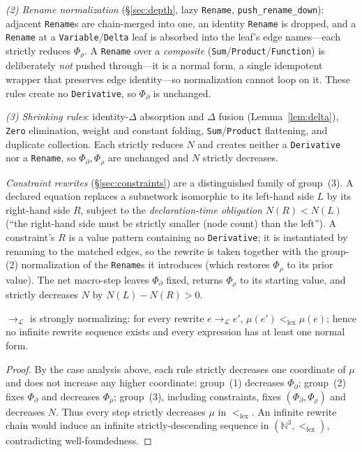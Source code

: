 \documentclass[sigplan,10pt,review]{acmart}
\begin{document}
\emph{(2) Rename normalization} (\S\ref{sec:depth}, lazy
\texttt{Rename}, \texttt{push\_rename\_down}): adjacent
\texttt{Rename}s are chain-merged into one, an identity \texttt{Rename}
is dropped, and a \texttt{Rename} at a \texttt{Variable}/\texttt{Delta}
leaf is absorbed into the leaf's edge names---each strictly reduces
$\Phi_\rho$. A \texttt{Rename} over a \emph{composite}
(\texttt{Sum}/\texttt{Product}/\texttt{Function}) is deliberately
\emph{not} pushed through---it is a normal form, a single idempotent
wrapper that preserves edge identity---so normalization cannot loop on
it. These rules create no \texttt{Derivative}, so $\Phi_\partial$ is
unchanged.

\emph{(3) Shrinking rules}: identity-$\Delta$ absorption and $\Delta$
fusion (Lemma~\ref{lem:delta}), \texttt{Zero} elimination, weight and
constant folding, \texttt{Sum}/\texttt{Product} flattening, and
duplicate collection. Each strictly reduces $N$ and creates neither a
\texttt{Derivative} nor a \texttt{Rename}, so $\Phi_\partial,\Phi_\rho$
are unchanged and $N$ strictly decreases.

\emph{Constraint rewrites} (\S\ref{sec:constraints}) are a distinguished
family of group~(3). A declared equation replaces a subnetwork
isomorphic to its left-hand side $L$ by its right-hand side $R$, subject
to the \emph{declaration-time obligation} $N(R)<N(L)$ (``the right-hand
side must be strictly smaller (node count) than the left''). A constraint's $R$ is a value pattern containing no \texttt{Derivative};
it is instantiated by renaming to the matched edges, so the rewrite is
taken together with the group-(2) normalization of the \texttt{Rename}s
it introduces (which restores $\Phi_\rho$ to its prior value). The net
macro-step leaves $\Phi_\partial$ fixed, returns $\Phi_\rho$ to its
starting value, and strictly decreases $N$ by $N(L)-N(R)>0$.

\begin{theorem}\label{thm:sn}
$\rightarrow_{\mathcal L}$ is strongly normalizing: for every rewrite
$e\rightarrow_{\mathcal L} e'$, $\mu(e')<_{\mathrm{lex}}\mu(e)$; hence no
infinite rewrite sequence exists and every expression has at least one
normal form.
\end{theorem}

\begin{proof}
By the case analysis above, each rule strictly decreases one coordinate
of $\mu$ and does not increase any higher coordinate: group~(1) decreases
$\Phi_\partial$; group~(2) fixes $\Phi_\partial$ and decreases
$\Phi_\rho$; group~(3), including constraints, fixes
$(\Phi_\partial,\Phi_\rho)$ and decreases $N$. Thus every step strictly
decreases $\mu$ in $<_{\mathrm{lex}}$. An infinite rewrite chain would
induce an infinite strictly-descending sequence in
$(\mathbb{N}^3,<_{\mathrm{lex}})$, contradicting well-foundedness.
\end{proof}
\end{document}
